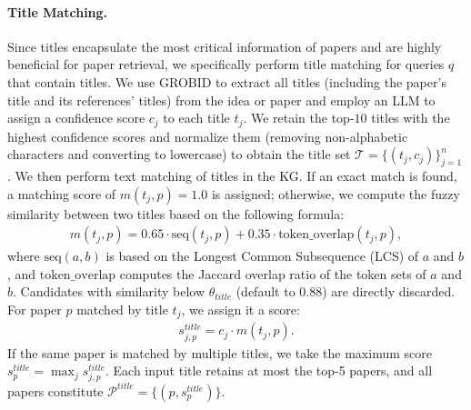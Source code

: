 \documentclass{llmxive}
\begin{document}
\paragraph{Title Matching.}
Since titles encapsulate the most critical information of papers and are highly beneficial for paper retrieval, we specifically perform title matching for queries $q$ that contain titles.
We use GROBID to extract all titles (including the paper's title and its references' titles) from the idea or paper and employ an LLM to assign a confidence score $c_j$ to each title $t_j$.
We retain the top-$10$ titles with the highest confidence scores and normalize them (removing non-alphabetic characters and converting to lowercase) to obtain the title set $\mathcal{T}=\{(t_j, c_j)\}_{j=1}^n$.
We then perform text matching of titles in the KG.
If an exact match is found, a matching score of $m(t_j, p)=1.0$ is assigned; otherwise, we compute the fuzzy similarity between two titles based on the following formula:
\begin{align}
    m(t_j, p)=0.65\cdot \text{seq}(t_j, p)+0.35\cdot \text{token\_overlap}(t_j, p),
\end{align}
where $\text{seq}(a, b)$ is based on the Longest Common Subsequence (LCS) of $a$ and $b$, and $\text{token\_overlap}$ computes the Jaccard overlap ratio of the token sets of $a$ and $b$.
Candidates with similarity below $\theta_{title}$ (default to $0.88$) are directly discarded.
For paper $p$ matched by title $t_j$, we assign it a score:
\begin{align}
    s_{j,p}^{title}=c_j\cdot m(t_j,p).
\end{align}
If the same paper is matched by multiple titles, we take the maximum score $s_p^{title}=\max_js_{j,p}^{title}$.
Each input title retains at most the top-5 papers, and all papers constitute $\mathcal{P}^{title}=\{(p, s_p^{title})\}$.
\end{document}
